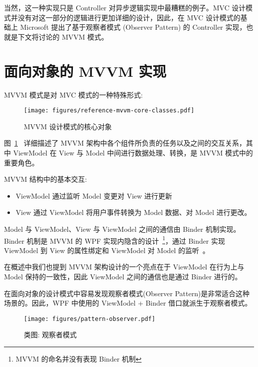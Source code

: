 当然，这一种实现只是 Controller 对异步逻辑实现中最糟糕的例子。MVC 设计模式并没有对这一部分的逻辑进行更加详细的设计，因此，在 MVC 设计模式的基础上 Microsoft 提出了基于观察者模式 (Observer Pattern) 的 Controller 实现，也就是下文将讨论的 MVVM 模式。

\section{面向对象的 MVVM 实现}

MVVM 模式是对 MVC 模式的一种特殊形式:

\begin{figure}[!h]
  \begin{center}
    \texttt{[image: figures/reference-mvvm-core-classes.pdf]}
    \caption{MVVM 设计模式的核心对象\label{MVVMCoreClasses}}
  \end{center}
\end{figure}

图~\ref{MVVMCoreClasses}~\cite{ghoda2012windows} 详细描述了 MVVM 架构中各个组件所负责的任务以及之间的交互关系，其中 ViewModel 在 View 与 Model 中间进行数据处理、转换，是 MVVM 模式中的重要角色。

MVVM 结构中的基本交互:

\begin{itemize}
  \item ViewModel 通过监听 Model 变更对 View 进行更新
  \item View 通过 ViewModel 将用户事件转换为 Model 数据、对 Model 进行更改。
\end{itemize}

Model 与 ViewModel、View 与 ViewModel 之间的通信由 Binder 机制实现。Binder 机制是 MVVM 的 WPF 实现内隐含的设计~\footnote{MVVM 的命名并没有表现 Binder 机制}，通过 Binder 实现 ViewModel 到 View 的属性绑定和 ViewModel 对 Model 的监听~\cite{Likness2010}。

在概述中我们也提到 MVVM 架构设计的一个亮点在于 ViewModel 在行为上与 Model 保持的一致性，因此 ViewModel 之间的通信也是通过 Binder 进行的。

在面向对象的设计模式中容易发现观察者模式(Observer Pattern)是非常适合这种场景的。因此，WPF 中使用的 ViewModel + Binder 借口就派生于观察者模式。

\begin{figure}[!h]
  \begin{center}
    \texttt{[image: figures/pattern-observer.pdf]}
    \caption{类图: 观察者模式\label{PatternObserver}}
  \end{center}
\end{figure}

